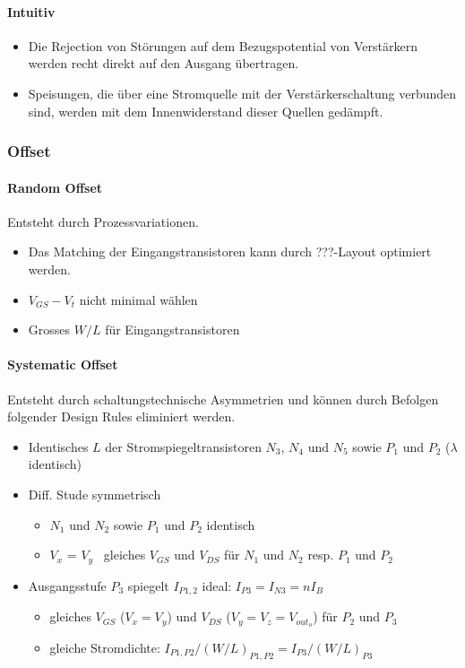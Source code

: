 \paragraph{Intuitiv}

\begin{itemize}
    \item Die Rejection von Störungen auf dem Bezugspotential von Verstärkern werden recht direkt auf den Ausgang übertragen.
    \item Speisungen, die über eine Stromquelle mit der Verstärkerschaltung verbunden sind, werden mit dem Innenwiderstand dieser Quellen gedämpft.
\end{itemize}

\subsubsection{Offset}

\paragraph{Random Offset}
Entsteht durch Prozessvariationen.
\begin{itemize}
    \item Das Matching der Eingangstransistoren kann durch ???-Layout optimiert werden.
    \item $V_{GS} - V_t$ nicht minimal wählen
    \item Grosses $W/L$ für Eingangstransistoren
\end{itemize}

\paragraph{Systematic Offset}
Entsteht durch schaltungstechnische Asymmetrien und können durch Befolgen folgender Design Rules eliminiert werden.
\begin{itemize}
    \item Identisches $L$ der Stromspiegeltransistoren $N_3$, $N_4$ und $N_5$ sowie $P_1$ und $P_2$ ($\lambda$ identisch)
    \item Diff. Stude symmetrisch
    \begin{itemize}
        \item $N_1$ und $N_2$ sowie $P_1$ und $P_2$ identisch
        \item $V_x$ = $V_y$ \textrightarrow\ gleiches $V_{GS}$ und $V_{DS}$ für $N_1$ und $N_2$ resp. $P_1$ und $P_2$
    \end{itemize} 
    \item Ausgangsstufe $P_3$ spiegelt $I_{P1,2}$ ideal: $I_{P3} = I_{N3} = n I_B$
    \begin{itemize}
        \item gleiches $V_{GS}$ ($V_x = V_y$) und $V_{DS}$ ($V_y = V_z = V_{out_o}$) für $P_2$ und $P_3$
        \item gleiche Stromdichte: $I_{P1,P2} / (W/L)_{P1,P2} = I_{P3} / (W/L)_{P3}$
    \end{itemize}
\end{itemize}